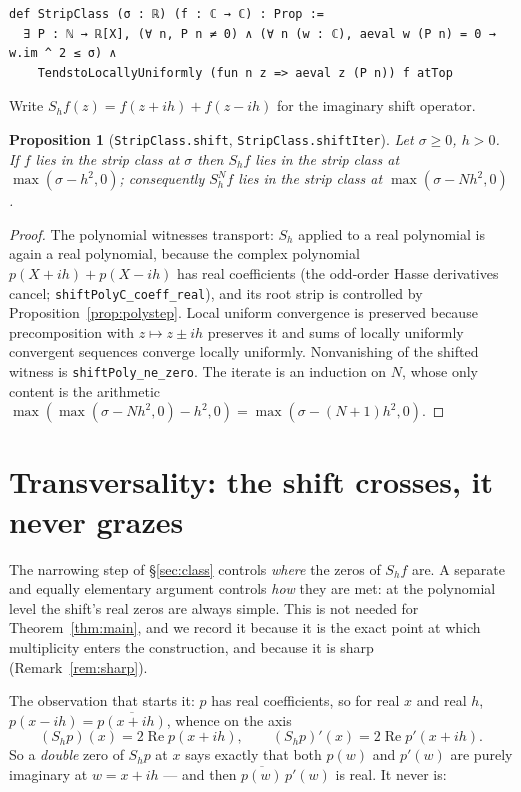 \documentclass[11pt]{article}
\newtheorem{proposition}[theorem]{Proposition}
\theoremstyle{definition}
\DeclareMathOperator{\Reop}{Re}
\begin{document}
\begin{lstlisting}
def StripClass (σ : ℝ) (f : ℂ → ℂ) : Prop :=
  ∃ P : ℕ → ℝ[X], (∀ n, P n ≠ 0) ∧ (∀ n (w : ℂ), aeval w (P n) = 0 → w.im ^ 2 ≤ σ) ∧
    TendstoLocallyUniformly (fun n z => aeval z (P n)) f atTop
\end{lstlisting}

Write $S_h f(z)=f(z+ih)+f(z-ih)$ for the imaginary shift operator.

\begin{proposition}[\texttt{StripClass.shift}, \texttt{StripClass.shiftIter}]\label{prop:shift}
Let $\sigma\ge0$, $h>0$.  If $f$ lies in the strip class at $\sigma$ then $S_hf$ lies in the strip
class at $\max(\sigma-h^{2},0)$; consequently $S_h^{N}f$ lies in the strip class at
$\max(\sigma-Nh^{2},0)$.
\end{proposition}

\begin{proof}
The polynomial witnesses transport: $S_h$ applied to a real polynomial is again a real polynomial,
because the complex polynomial $p(X+ih)+p(X-ih)$ has real coefficients (the odd-order Hasse
derivatives cancel; \texttt{shiftPolyC\_coeff\_real}), and its root strip is controlled by
Proposition~\ref{prop:polystep}.  Local uniform convergence is preserved because precomposition with
$z\mapsto z\pm ih$ preserves it and sums of locally uniformly convergent sequences converge locally
uniformly.  Nonvanishing of the shifted witness is \texttt{shiftPoly\_ne\_zero}.  The iterate is an
induction on $N$, whose only content is the arithmetic
$\max(\max(\sigma-Nh^{2},0)-h^{2},0)=\max(\sigma-(N{+}1)h^{2},0)$.
\end{proof}

\section{Transversality: the shift crosses, it never grazes}\label{sec:transversal}

The narrowing step of \S\ref{sec:class} controls \emph{where} the zeros of $S_hf$ are.  A separate and
equally elementary argument controls \emph{how} they are met: at the polynomial level the shift's real
zeros are always simple.  This is not needed for Theorem~\ref{thm:main}, and we record it because it
is the exact point at which multiplicity enters the construction, and because it is sharp
(Remark~\ref{rem:sharp}).

The observation that starts it: $p$ has real coefficients, so for real $x$ and real $h$,
$p(x-ih)=\overline{p(x+ih)}$, whence on the axis
\begin{equation}\label{eq:axisshift}
  (S_hp)(x)=2\Reop p(x+ih),\qquad (S_hp)'(x)=2\Reop p'(x+ih).
\end{equation}
So a \emph{double} zero of $S_hp$ at $x$ says exactly that both $p(w)$ and $p'(w)$ are purely
imaginary at $w=x+ih$ --- and then $\overline{p(w)}\,p'(w)$ is real.  It never is:
\end{document}

